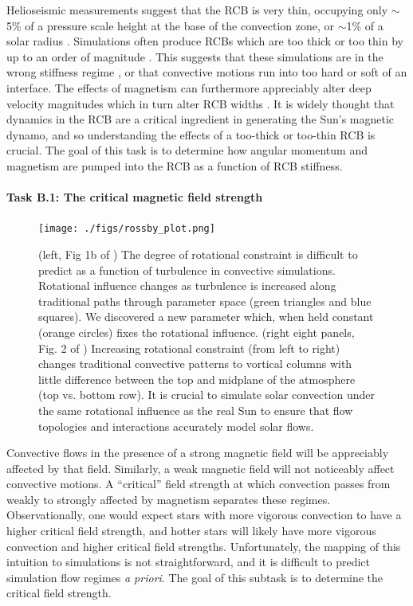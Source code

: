 \documentclass[11pt, preprint]{aastex}
\begin{document}
Helioseismic measurements suggest that the RCB is very thin, occupying only $\sim$5\% of a pressure scale height at the base of the convection zone, or $\sim$1\% of a solar radius \citep{basu1997}.
Simulations often produce RCBs which are too thick or too thin by up to an order of magnitude \citep[see e.g.,][]{hotta2017, kapyla2018}.
This suggests that these simulations are in the wrong stiffness regime \citep{brummell&all2002, couston&all2017}, or that convective motions run into too hard or soft of an interface.
The effects of magnetism can furthermore appreciably alter deep velocity magnitudes which in turn alter RCB widths \citep{hotta&all2015}.
It is widely thought that dynamics in the RCB are a critical ingredient in generating the Sun's magnetic dynamo, and so understanding the effects of a too-thick or too-thin RCB is crucial.
The goal of this task is to determine how angular momentum and magnetism are pumped into the RCB as a function of RCB stiffness.



\vspace{-0.5cm}
\paragraph{Task B.1: The critical magnetic field strength}
\label{sct:taskB1}
\begin{figure}[t!]
    \texttt{[image: ./figs/rossby\_plot.png]}
	\vspace{-1cm}
    \caption{(left, Fig 1b of \citet{anders&all2019}) The degree of rotational constraint is difficult to predict as a function of turbulence in convective simulations.
	Rotational influence changes as turbulence is increased along traditional paths through parameter space (green triangles and blue squares).
	We discovered a new parameter which, when held constant (orange circles) fixes the rotational influence.
	(right eight panels, Fig. 2 of \citet{anders&all2019}) Increasing rotational constraint (from left to right) changes traditional convective patterns to vortical columns with little difference between the top and midplane of the atmosphere (top vs. bottom row).
	It is crucial to simulate solar convection under the same rotational influence as the real Sun to ensure that flow topologies and interactions accurately model solar flows.
	\label{fig:rossby_plot} }
	\vspace{-0.3cm}
\end{figure}

Convective flows in the presence of a strong magnetic field will be appreciably affected by that field.
Similarly, a weak magnetic field will not noticeably affect convective motions.
A ``critical'' field strength at which convection passes from weakly to strongly affected by magnetism separates these regimes.
Observationally, one would expect stars with more vigorous convection to have a higher critical field strength, and hotter stars will likely have more vigorous convection and higher critical field strengths.
Unfortunately, the mapping of this intuition to simulations is not straightforward, and it is difficult to predict simulation flow regimes \emph{a priori}.
The goal of this subtask is to determine the critical field strength.
\end{document}

